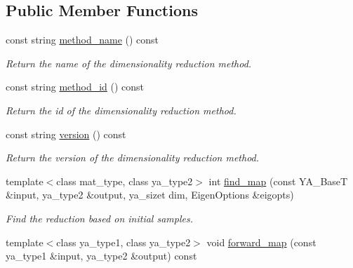 \subsection*{Public Member Functions}
\begin{CompactItemize}
\item 
\hypertarget{class_y_a_l_l_e_reduce_a2}{
const string \hyperlink{class_y_a_l_l_e_reduce_a2}{method\_\-name} () const }
\label{class_y_a_l_l_e_reduce_a2}

\begin{CompactList}\small\item\em Return the name of the dimensionality reduction method. \item\end{CompactList}\item 
\hypertarget{class_y_a_l_l_e_reduce_a3}{
const string \hyperlink{class_y_a_l_l_e_reduce_a3}{method\_\-id} () const }
\label{class_y_a_l_l_e_reduce_a3}

\begin{CompactList}\small\item\em Return the id of the dimensionality reduction method. \item\end{CompactList}\item 
\hypertarget{class_y_a_l_l_e_reduce_a4}{
const string \hyperlink{class_y_a_l_l_e_reduce_a4}{version} () const }
\label{class_y_a_l_l_e_reduce_a4}

\begin{CompactList}\small\item\em Return the version of the dimensionality reduction method. \item\end{CompactList}\item 
template$<$class mat\_\-type, class ya\_\-type2$>$ int \hyperlink{class_y_a_l_l_e_reduce_a5}{find\_\-map} (const YA\_\-Base\-T \&input, ya\_\-type2 \&output, ya\_\-sizet dim, Eigen\-Options \&eigopts)
\begin{CompactList}\small\item\em Find the reduction based on initial samples. \item\end{CompactList}\item 
\hypertarget{class_y_a_l_l_e_reduce_a6}{
template$<$class ya\_\-type1, class ya\_\-type2$>$ void \hyperlink{class_y_a_l_l_e_reduce_a6}{forward\_\-map} (const ya\_\-type1 \&input, ya\_\-type2 \&output) const }
\label{class_y_a_l_l_e_reduce_a6}


\end{CompactItemize}
